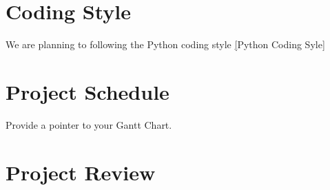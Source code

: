 \documentclass{article}
\begin{document}
\section{Coding Style}

We are planning to following the Python coding style
\href{https://google.github.io/styleguide/pyguide.html}[Python Coding Syle]

\section{Project Schedule}

Provide a pointer to your Gantt Chart.

\section{Project Review}
\end{document}
